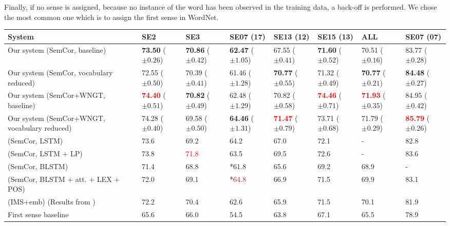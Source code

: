\documentclass[11pt,a4paper]{article}
\newcommand{\tbf}[1]{\textbf{#1}}
\begin{document}
Finally, if no sense is assigned, because no instance of the word has been observed in the training data, a back-off is performed. We chose the most common one which is to assign the first sense in WordNet. 

\begin{table*}[htbp]
\small
\begin{center}
\tabulinesep=2pt
\begin{tabu} to \linewidth {X[5lm]X[1cm]X[1cm]X[1cm]X[1cm]X[1cm]X[1cm]X[1cm]} \toprule
System & SE2 & SE3 & SE07 (17) & SE13 (12) & SE15 (13) & ALL & SE07 (07)\\
\midrule
Our system (SemCor, baseline) & \tbf{73.50} ($\pm 0.26$) & \tbf{70.86} ($\pm 0.42$) & \tbf{62.47} ($\pm 1.05$) & 67.55 ($\pm 0.41$) & \tbf{71.60} ($\pm 0.52$) & 70.51 ($\pm 0.16$) & 83.77 ($\pm 0.28$)\\
 Our system (SemCor, vocabulary reduced) & 72.55 ($\pm 0.50$) & 70.39 ($\pm 0.41$) & 61.46 ($\pm 1.28$) & \tbf{70.77} ($\pm 0.55$) & 71.32 ($\pm 0.49$) & \tbf{70.77} ($\pm 0.21$) & \tbf{84.48} ($\pm 0.27$) \\
\midrule
Our system (SemCor+WNGT, baseline) & \textcolor{red}{\tbf{74.40}} ($\pm 0.51$) & \tbf{70.82} ($\pm 0.49$) & 62.48 ($\pm 1.29$) & 70.82 ($\pm 0.58$) & \textcolor{red}{\tbf{74.46}} ($\pm 0.71$) & \textcolor{red}{\tbf{71.93}} ($\pm 0.35$) & 84.95 ($\pm 0.42$) \\
 Our system (SemCor+WNGT, vocabulary reduced) & 74.28 ($\pm 0.40$) & 69.58 ($\pm 0.50$) & \tbf{64.46} ($\pm 1.31$) & \textcolor{red}{\tbf{71.47}} ($\pm 0.79$) & 73.71 ($\pm 0.68$) & 71.79 ($\pm 0.29$) & \textcolor{red}{\tbf{85.79}} ($\pm 0.26$) \\
\midrule
\citep{yuan_2016} (SemCor, LSTM) & 73.6 & 69.2 & 64.2 & 67.0 & 72.1 & - & 82.8 \\
 \citep{yuan_2016} (SemCor, LSTM + LP) & 73.8 & \textcolor{red}{71.8} & 63.5 & 69.5 & 72.6 & - & 83.6 \\
\citep{raganato2017} (SemCor, BLSTM) & 71.4 & 68.8 & *61.8 & 65.6 & 69.2 & 68.9 & - \\
 \citep{raganato2017} (SemCor, BLSTM + att. + LEX + POS) & 72.0 & 69.1 & *\textcolor{red}{64.8} & 66.9 & 71.5 & 69.9 & 83.1 \\
\citep{iacobacci2016embeddings} (IMS+emb) (Results from \citet{raganato2017}) & 72.2 & 70.4 & 62.6 & 65.9 & 71.5 & 70.1 & 81.9 \\
\midrule
First sense baseline & 65.6 & 66.0 & 54.5 & 63.8 & 67.1 & 65.5 & 78.9\\

\end{tabu}
\end{center}
\end{table*}
\end{document}
